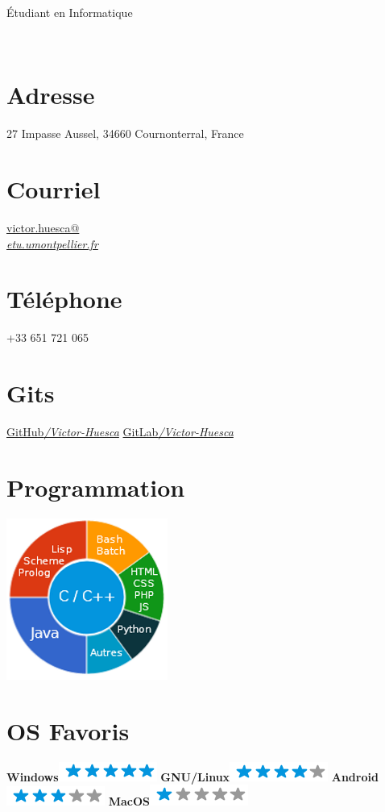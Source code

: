 \documentclass[]{friggeri-cv}
\begin{document}
      {Étudiant en Informatique}
      

\begin{aside}
    ~~~
  \section{Adresse}
    27 Impasse Aussel,
    34660 Cournonterral, France
    ~
  \section{Courriel}
    \href{mailto:victor.huesca@etu.umontpellier.fr}{victor.huesca@\\\textit{etu.umontpellier.fr}}
    ~
  \section{Téléphone}
    \numero +33 651 721 065
    ~
  \section{Gits}
    \href{https://github.com/Victor333Huesca}{GitHub\textit{/Victor-Huesca}}
    \href{https://gitlab.info-ufr.univ-montp2.fr/u/e20150002352}{GitLab\textit{/Victor-Huesca}}
    ~
  \section{Programmation}
    \includegraphics[scale=0.66]{img/prog.png}
    ~
  \section{OS Favoris}
    \textbf{Windows}\includegraphics[scale=0.40]{img/5stars.png}
    \textbf{GNU/Linux}\includegraphics[scale=0.40]{img/4stars.png}
    \textbf{Android}\includegraphics[scale=0.40]{img/3stars.png}
    \textbf{MacOS}\includegraphics[scale=0.40]{img/1stars.png}
    ~

\end{aside}
\end{document}
